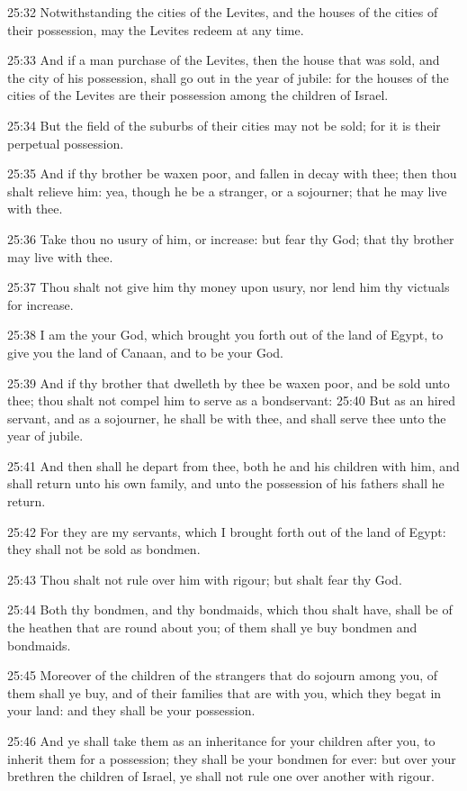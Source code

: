 25:32 Notwithstanding the cities of the Levites, and the houses of the cities of their possession, may the Levites redeem at any time.

25:33 And if a man purchase of the Levites, then the house that was sold, and the city of his possession, shall go out in the year of jubile: for the houses of the cities of the Levites are their possession among the children of Israel.

25:34 But the field of the suburbs of their cities may not be sold; for it is their perpetual possession.

25:35 And if thy brother be waxen poor, and fallen in decay with thee; then thou shalt relieve him: yea, though he be a stranger, or a sojourner; that he may live with thee.

25:36 Take thou no usury of him, or increase: but fear thy God; that thy brother may live with thee.

25:37 Thou shalt not give him thy money upon usury, nor lend him thy victuals for increase.

25:38 I am the \LORD your God, which brought you forth out of the land of Egypt, to give you the land of Canaan, and to be your God.

25:39 And if thy brother that dwelleth by thee be waxen poor, and be sold unto thee; thou shalt not compel him to serve as a bondservant: 25:40 But as an hired servant, and as a sojourner, he shall be with thee, and shall serve thee unto the year of jubile.

25:41 And then shall he depart from thee, both he and his children with him, and shall return unto his own family, and unto the possession of his fathers shall he return.

25:42 For they are my servants, which I brought forth out of the land of Egypt: they shall not be sold as bondmen.

25:43 Thou shalt not rule over him with rigour; but shalt fear thy God.

25:44 Both thy bondmen, and thy bondmaids, which thou shalt have, shall be of the heathen that are round about you; of them shall ye buy bondmen and bondmaids.

25:45 Moreover of the children of the strangers that do sojourn among you, of them shall ye buy, and of their families that are with you, which they begat in your land: and they shall be your possession.

25:46 And ye shall take them as an inheritance for your children after you, to inherit them for a possession; they shall be your bondmen for ever: but over your brethren the children of Israel, ye shall not rule one over another with rigour.

